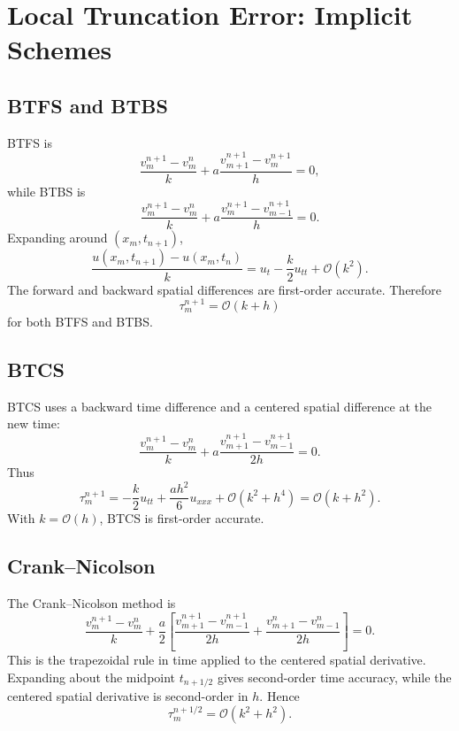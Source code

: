 \documentclass[11pt]{article}
\newcommand{\Oh}{\mathcal{O}}
\begin{document}
\section{Local Truncation Error: Implicit Schemes}

\subsection{BTFS and BTBS}

BTFS is
\begin{equation}
    \frac{v_m^{n+1}-v_m^n}{k}
    +a\frac{v_{m+1}^{n+1}-v_m^{n+1}}{h}=0,
\end{equation}
while BTBS is
\begin{equation}
    \frac{v_m^{n+1}-v_m^n}{k}
    +a\frac{v_m^{n+1}-v_{m-1}^{n+1}}{h}=0.
\end{equation}
Expanding around $(x_m,t_{n+1})$,
\begin{equation}
    \frac{u(x_m,t_{n+1})-u(x_m,t_n)}{k}
    =
    u_t-\frac{k}{2}u_{tt}+\Oh(k^2).
\end{equation}
The forward and backward spatial differences are first-order accurate.  Therefore
\begin{equation}
    \tau_m^{n+1}=\Oh(k+h)
\end{equation}
for both BTFS and BTBS.

\subsection{BTCS}

BTCS uses a backward time difference and a centered spatial difference at the new time:
\begin{equation}
    \frac{v_m^{n+1}-v_m^n}{k}
    +a\frac{v_{m+1}^{n+1}-v_{m-1}^{n+1}}{2h}=0.
\end{equation}
Thus
\begin{equation}
    \tau_m^{n+1}
    =
    -\frac{k}{2}u_{tt}
    +\frac{a h^2}{6}u_{xxx}
    +\Oh(k^2+h^4)
    =
    \Oh(k+h^2).
\end{equation}
With $k=\Oh(h)$, BTCS is first-order accurate.

\subsection{Crank--Nicolson}

The Crank--Nicolson method is
\begin{equation}
    \frac{v_m^{n+1}-v_m^n}{k}
    +\frac{a}{2}
    \left[
        \frac{v_{m+1}^{n+1}-v_{m-1}^{n+1}}{2h}
        +
        \frac{v_{m+1}^{n}-v_{m-1}^{n}}{2h}
    \right]=0.
\end{equation}
This is the trapezoidal rule in time applied to the centered spatial derivative.  Expanding about the midpoint $t_{n+1/2}$ gives second-order time accuracy, while the centered spatial derivative is second-order in $h$. Hence
\begin{equation}
    \tau_m^{n+1/2}=\Oh(k^2+h^2).
\end{equation}
\end{document}
